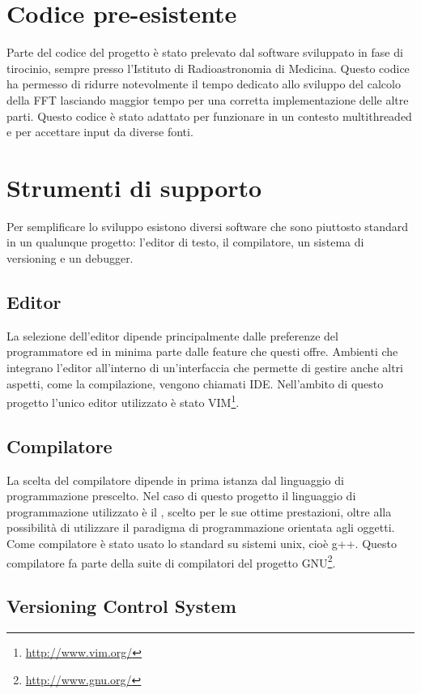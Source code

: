 \section{Codice pre-esistente}
Parte del codice del progetto \`e stato prelevato dal software sviluppato in
fase di tirocinio, sempre presso l'Istituto di Radioastronomia di Medicina.
Questo codice ha permesso di ridurre notevolmente il tempo dedicato allo
sviluppo del calcolo della \ac{FFT} lasciando maggior tempo per una corretta
implementazione delle altre parti. Questo codice \`e stato adattato per
funzionare in un contesto multithreaded e per accettare input da diverse fonti.

\section{Strumenti di supporto}
Per semplificare lo sviluppo esistono diversi software che sono piuttosto
standard in un qualunque progetto: l'editor di testo, il compilatore, un sistema
di versioning e un debugger.

\subsection{Editor}
La selezione dell'editor dipende principalmente dalle preferenze del
programmatore ed in minima parte dalle feature che questi offre. Ambienti che
integrano l'editor all'interno di un'interfaccia che permette di gestire anche
altri aspetti, come la compilazione, vengono chiamati \ac{IDE}. Nell'ambito di
questo progetto l'unico editor utilizzato \`e stato
VIM\footnote{\url{http://www.vim.org/}}.

\subsection{Compilatore}
La scelta del compilatore dipende in prima istanza dal linguaggio di
programmazione prescelto. Nel caso di questo progetto il linguaggio di
programmazione utilizzato \`e il \CC, scelto per le sue ottime prestazioni,
oltre alla possibilit\`a di utilizzare il paradigma di programmazione
orientata agli oggetti. Come compilatore \`e stato usato lo standard su sistemi
unix, cio\`e g++. Questo compilatore fa parte della suite di compilatori del
progetto GNU\footnote{\url{http://www.gnu.org/}}.

\subsection{Versioning Control System}

